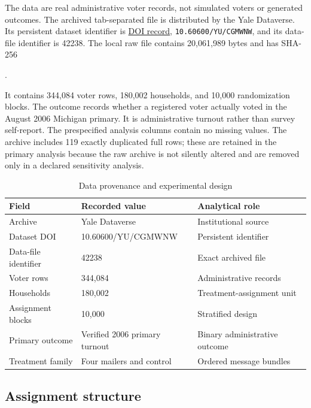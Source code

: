 \documentclass[a4paper,12pt]{article}
\begin{document}
The data are real administrative voter records, not simulated voters or generated outcomes. The archived tab-separated file is distributed by the Yale Dataverse. Its persistent dataset identifier is \href{https://doi.org/10.60600/YU/CGMWNW}{DOI record}, \nolinkurl{10.60600/YU/CGMWNW}, and its data-file identifier is 42238. The local raw file contains 20,061,989 bytes and has SHA-256
\begin{center}
\small{}.
\end{center}
It contains 344,084 voter rows, 180,002 households, and 10,000 randomization blocks. The outcome records whether a registered voter actually voted in the August 2006 Michigan primary. It is administrative turnout rather than survey self-report. The prespecified analysis columns contain no missing values. The archive includes 119 exactly duplicated full rows; these are retained in the primary analysis because the raw archive is not silently altered and are removed only in a declared sensitivity analysis.

\begin{table}[H]
\centering
\caption{Data provenance and experimental design}
\label{tab:provenance}
\small
\setlength{\tabcolsep}{6pt}
\begin{tabularx}{0.96\textwidth}{lXl}
\toprule
Field & Recorded value & Analytical role \\
\midrule
Archive & Yale Dataverse & Institutional source \\
Dataset DOI & 10.60600/YU/CGMWNW & Persistent identifier \\
Data-file identifier & 42238 & Exact archived file \\
Voter rows & 344,084 & Administrative records \\
Households & 180,002 & Treatment-assignment unit \\
Assignment blocks & 10,000 & Stratified design \\
Primary outcome & Verified 2006 primary turnout & Binary administrative outcome \\
Treatment family & Four mailers and control & Ordered message bundles \\
\bottomrule
\end{tabularx}
\end{table}

\subsection{Assignment structure}
\end{document}
